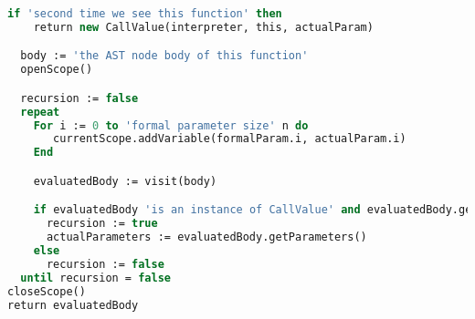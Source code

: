 \begin{lstlisting}[language=Pascal,label=alg:tailrecursion, caption={\emph{Detecting tail recursion during call of a function.}}]
  if 'second time we see this function' then
    return new CallValue(interpreter, this, actualParam)

  body := 'the AST node body of this function'
  openScope()

  recursion := false
  repeat
    For i := 0 to 'formal parameter size' n do
       currentScope.addVariable(formalParam.i, actualParam.i)
    End

    evaluatedBody := visit(body)

    if evaluatedBody 'is an instance of CallValue' and evaluatedBody.getFunction() = this then
      recursion := true
      actualParameters := evaluatedBody.getParameters()
    else
      recursion := false
  until recursion = false 
closeScope()
return evaluatedBody
\end{lstlisting}

%
%  
%  
